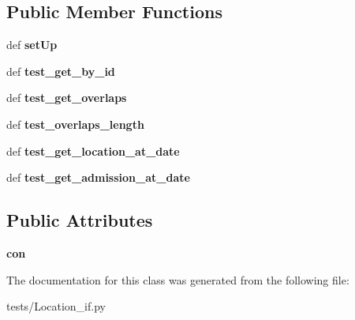 \subsection*{Public Member Functions}
\begin{DoxyCompactItemize}
\item 
\hypertarget{classtests_1_1_location__if_1_1_location_i_f_tests_ad056fc5b8cc9e805738ab45a695ca323}{def {\bfseries set\-Up}}\label{classtests_1_1_location__if_1_1_location_i_f_tests_ad056fc5b8cc9e805738ab45a695ca323}

\item 
\hypertarget{classtests_1_1_location__if_1_1_location_i_f_tests_a5f193b8d207f01725bb382b9d4fce667}{def {\bfseries test\-\_\-get\-\_\-by\-\_\-id}}\label{classtests_1_1_location__if_1_1_location_i_f_tests_a5f193b8d207f01725bb382b9d4fce667}

\item 
\hypertarget{classtests_1_1_location__if_1_1_location_i_f_tests_a9aa54e0a42d00be055e32f3dd9b03a21}{def {\bfseries test\-\_\-get\-\_\-overlaps}}\label{classtests_1_1_location__if_1_1_location_i_f_tests_a9aa54e0a42d00be055e32f3dd9b03a21}

\item 
\hypertarget{classtests_1_1_location__if_1_1_location_i_f_tests_a3e233c3a2001ccbc455ea9732e7c61cc}{def {\bfseries test\-\_\-overlaps\-\_\-length}}\label{classtests_1_1_location__if_1_1_location_i_f_tests_a3e233c3a2001ccbc455ea9732e7c61cc}

\item 
\hypertarget{classtests_1_1_location__if_1_1_location_i_f_tests_a1dc450a9309495c6007c055a21288da0}{def {\bfseries test\-\_\-get\-\_\-location\-\_\-at\-\_\-date}}\label{classtests_1_1_location__if_1_1_location_i_f_tests_a1dc450a9309495c6007c055a21288da0}

\item 
\hypertarget{classtests_1_1_location__if_1_1_location_i_f_tests_a04e8e3a28c07d32cf031a94a4ae6847f}{def {\bfseries test\-\_\-get\-\_\-admission\-\_\-at\-\_\-date}}\label{classtests_1_1_location__if_1_1_location_i_f_tests_a04e8e3a28c07d32cf031a94a4ae6847f}

\end{DoxyCompactItemize}
\subsection*{Public Attributes}
\begin{DoxyCompactItemize}
\item 
\hypertarget{classtests_1_1_location__if_1_1_location_i_f_tests_ac10603a5576a6a6ae5c3df1b4a2f067e}{{\bfseries con}}\label{classtests_1_1_location__if_1_1_location_i_f_tests_ac10603a5576a6a6ae5c3df1b4a2f067e}

\end{DoxyCompactItemize}


The documentation for this class was generated from the following file\-:\begin{DoxyCompactItemize}
\item 
tests/Location\-\_\-if.\-py\end{DoxyCompactItemize}
